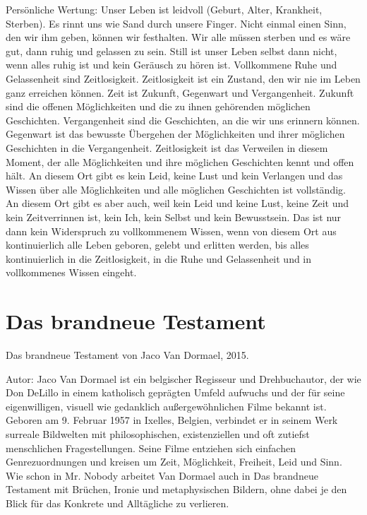 \documentclass[
  ngerman,
]{article}
\begin{document}
Persönliche Wertung: Unser Leben ist leidvoll (Geburt, Alter, Krankheit,
Sterben). Es rinnt uns wie Sand durch unsere Finger. Nicht einmal einen
Sinn, den wir ihm geben, können wir festhalten. Wir alle müssen sterben
und es wäre gut, dann ruhig und gelassen zu sein. Still ist unser Leben
selbst dann nicht, wenn alles ruhig ist und kein Geräusch zu hören ist.
Vollkommene Ruhe und Gelassenheit sind Zeitlosigkeit. Zeitlosigkeit ist
ein Zustand, den wir nie im Leben ganz erreichen können. Zeit ist
Zukunft, Gegenwart und Vergangenheit. Zukunft sind die offenen
Möglichkeiten und die zu ihnen gehörenden möglichen Geschichten.
Vergangenheit sind die Geschichten, an die wir uns erinnern können.
Gegenwart ist das bewusste Übergehen der Möglichkeiten und ihrer
möglichen Geschichten in die Vergangenheit. Zeitlosigkeit ist das
Verweilen in diesem Moment, der alle Möglichkeiten und ihre möglichen
Geschichten kennt und offen hält. An diesem Ort gibt es kein Leid, keine
Lust und kein Verlangen und das Wissen über alle Möglichkeiten und alle
möglichen Geschichten ist vollständig. An diesem Ort gibt es aber auch,
weil kein Leid und keine Lust, keine Zeit und kein Zeitverrinnen ist,
kein Ich, kein Selbst und kein Bewusstsein. Das ist nur dann kein
Widerspruch zu vollkommenem Wissen, wenn von diesem Ort aus
kontinuierlich alle Leben geboren, gelebt und erlitten werden, bis alles
kontinuierlich in die Zeitlosigkeit, in die Ruhe und Gelassenheit und in
vollkommenes Wissen eingeht.

\section{Das brandneue Testament}\label{das-brandneue-testament}

Das brandneue Testament von Jaco Van Dormael, 2015.

Autor: Jaco Van Dormael ist ein belgischer Regisseur und Drehbuchautor,
der wie Don DeLillo in einem katholisch geprägten Umfeld aufwuchs und
der für seine eigenwilligen, visuell wie gedanklich außergewöhnlichen
Filme bekannt ist. Geboren am 9. Februar 1957 in Ixelles, Belgien,
verbindet er in seinem Werk surreale Bildwelten mit philosophischen,
existenziellen und oft zutiefst menschlichen Fragestellungen. Seine
Filme entziehen sich einfachen Genrezuordnungen und kreisen um Zeit,
Möglichkeit, Freiheit, Leid und Sinn. Wie schon in Mr. Nobody arbeitet
Van Dormael auch in Das brandneue Testament mit Brüchen, Ironie und
metaphysischen Bildern, ohne dabei je den Blick für das Konkrete und
Alltägliche zu verlieren.
\end{document}
